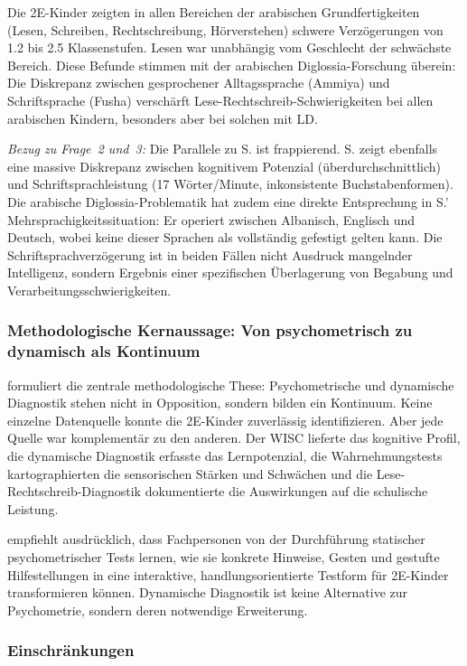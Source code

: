 \documentclass[ngerman, a4paper]{article}
\begin{document}
Die 2E-Kinder zeigten in allen Bereichen der arabischen Grundfertigkeiten
(Lesen, Schreiben, Rechtschreibung, Hörverstehen) schwere Verzögerungen
von 1.2 bis 2.5 Klassenstufen. Lesen war unabhängig vom Geschlecht der
schwächste Bereich. Diese Befunde stimmen mit der arabischen
Diglossia-Forschung überein: Die Diskrepanz zwischen gesprochener
Alltagssprache (Ammiya) und Schriftsprache (Fusha) verschärft
Lese-Rechtschreib-Schwierigkeiten bei allen arabischen Kindern, besonders
aber bei solchen mit LD.

\textit{Bezug zu Frage~2 und~3:} Die Parallele zu S. ist frappierend. S.
zeigt ebenfalls eine massive Diskrepanz zwischen kognitivem Potenzial
(überdurchschnittlich) und Schriftsprachleistung (17 Wörter/Minute,
inkonsistente Buchstabenformen). Die arabische Diglossia-Problematik hat
zudem eine direkte Entsprechung in S.' Mehrsprachigkeitssituation: Er
operiert zwischen Albanisch, Englisch und Deutsch, wobei keine dieser
Sprachen als vollständig gefestigt gelten kann. Die
Schriftsprachverzögerung ist in beiden Fällen nicht Ausdruck mangelnder
Intelligenz, sondern Ergebnis einer spezifischen Überlagerung von Begabung
und Verarbeitungsschwierigkeiten.

\subsubsection*{Methodologische Kernaussage: Von psychometrisch zu
  dynamisch als Kontinuum}

\textcite{alhroub2021utility} formuliert die zentrale methodologische These: Psychometrische
und dynamische Diagnostik stehen nicht in Opposition, sondern bilden ein
Kontinuum. Keine einzelne Datenquelle konnte die 2E-Kinder zuverlässig
identifizieren. Aber jede Quelle war komplementär zu den anderen. Der WISC
lieferte das kognitive Profil, die dynamische Diagnostik erfasste das
Lernpotenzial, die Wahrnehmungstests kartographierten die sensorischen
Stärken und Schwächen und die Lese-Rechtschreib-Diagnostik dokumentierte
die Auswirkungen auf die schulische Leistung.

\textcite{alhroub2021utility} empfiehlt ausdrücklich, dass Fachpersonen von der Durchführung
statischer psychometrischer Tests lernen, wie sie konkrete Hinweise, Gesten
und gestufte Hilfestellungen in eine interaktive, handlungsorientierte
Testform für 2E-Kinder transformieren können. Dynamische Diagnostik ist
keine Alternative zur Psychometrie, sondern deren notwendige Erweiterung.

\subsubsection*{Einschränkungen}
\end{document}
